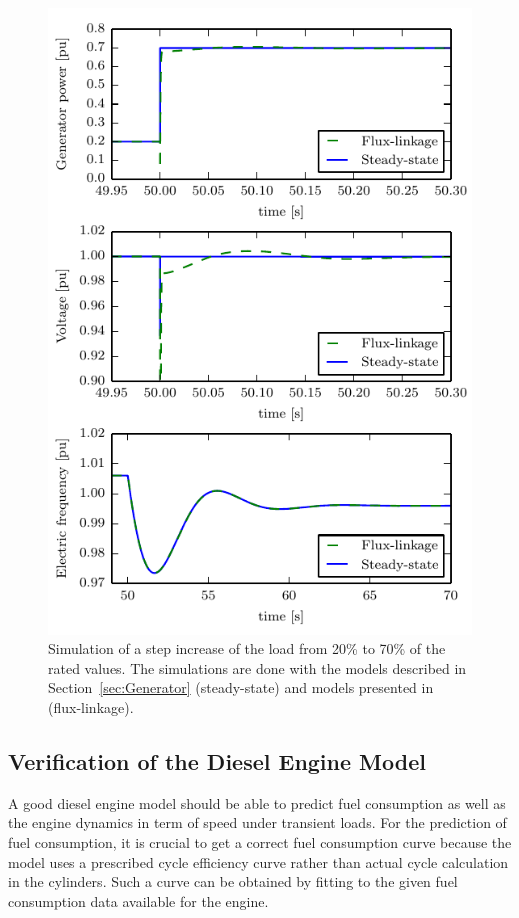\documentclass[journal]{IEEEtran}
\begin{document}
\begin{figure}
	\center
	\includegraphics[width=\columnwidth]{figures/fullVsSimplified}
	\caption{Simulation of a step increase of the load from 20\% to 70\% of the rated values. The simulations are done with the models described in Section~\ref{sec:Generator} (steady-state) and models presented in~\cite[Ch.~5.11]{Krause2013} (flux-linkage).}
	\label{fig:fullVsSimplified}
\end{figure}

\subsection{Verification of the Diesel Engine Model}
\label{sec:ICEverification}
A good diesel engine model should be able to predict fuel consumption as well as the engine dynamics in term of speed under transient loads. 
For the prediction of fuel consumption, it is crucial to get a correct fuel consumption curve because the model uses a prescribed cycle efficiency curve rather than actual cycle calculation in the cylinders. 
Such a curve can be obtained by fitting to the given fuel consumption data available for the engine. 
\end{document}
